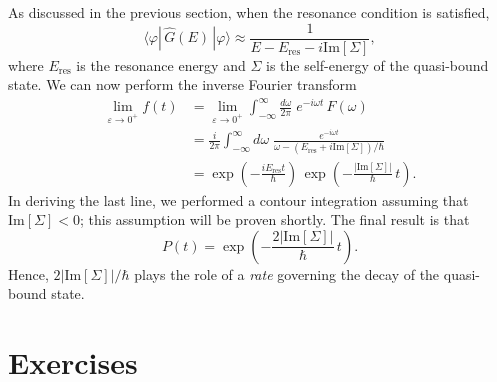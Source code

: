 \documentclass[pra,12pt]{revtex4}
\begin{document}
As discussed in the previous section, when the resonance condition is
satisfied,
$$ \langle\varphi|\,\hat{G}(E)\,|\varphi\rangle \approx \frac{1}{\displaystyle E - E_{\mathrm{res}} - i \mathrm{Im}[\Sigma]},$$
where $E_{\mathrm{res}}$ is the resonance energy and $\Sigma$ is the
self-energy of the quasi-bound state.  We can now perform the
inverse Fourier transform
$$\begin{aligned} \lim_{\varepsilon\rightarrow 0^+} f(t) &= \lim_{\varepsilon\rightarrow 0^+} \int_{-\infty}^{\infty} \frac{d\omega}{2\pi} \; e^{-i\omega t} \, F(\omega) \\ &= \frac{i}{2\pi} \int_{-\infty}^{\infty} d\omega\; \frac{e^{-i\omega t}}{\omega - (E_{\mathrm{res}}+i \mathrm{Im}[\Sigma])/\hbar}\\ &= \exp\left(-\frac{iE_{\mathrm{res}}t}{\hbar}\right)\, \exp\left(-\frac{|\mathrm{Im}[\Sigma]|}{\hbar}\,t\right). \end{aligned}$$
In deriving the last line, we performed a contour integration assuming
that $\mathrm{Im}[\Sigma] < 0$; this assumption will be proven
shortly.  The final result is that
$$P(t) = \exp\left(-\frac{2|\mathrm{Im}[\Sigma]|}{\hbar}\,t\right).$$
Hence, $2|\mathrm{Im}[\Sigma]|/\hbar$ plays the role of a
\textit{rate} governing the decay of the quasi-bound state.



\section*{Exercises}
\end{document}
